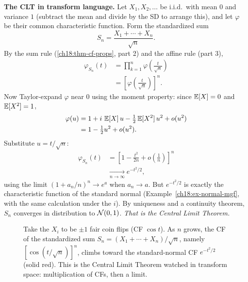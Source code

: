 \begin{focusbox}
\textbf{The CLT in transform language.} Let $X_1,X_2,\dots$ be i.i.d.\ with mean
$0$ and variance $1$ (subtract the mean and divide by the SD to arrange this),
and let $\varphi$ be their common characteristic function. Form the standardized
sum
\[
  S_n = \frac{X_1+\cdots+X_n}{\sqrt n}.
\]
By the sum rule (\ref{ch18:thm-cf-props}, part 2) and the affine rule (part 3),
\begin{align*}
  \varphi_{S_n}(t)
   &= \prod_{k=1}^n \varphi\!\left(\frac{t}{\sqrt n}\right) \\
   &= \left[\varphi\!\left(\frac{t}{\sqrt n}\right)\right]^n .
\end{align*}
Now Taylor-expand $\varphi$ near $0$ using the moment property: since $\operatorname{\mathbb{E}}[X]=0$
and $\operatorname{\mathbb{E}}[X^2]=1$,
\begin{align*}
  \varphi(u) &= 1 + i\,\operatorname{\mathbb{E}}[X]\,u - \tfrac12 \operatorname{\mathbb{E}}[X^2]\,u^2 + o(u^2) \\
             &= 1 - \tfrac12 u^2 + o(u^2).
\end{align*}
Substitute $u=t/\sqrt n$:
\begin{align*}
  \varphi_{S_n}(t)
   &= \left[1 - \frac{t^2}{2n} + o\!\left(\frac{1}{n}\right)\right]^n \\
   &\xrightarrow[n\to\infty]{} e^{-t^2/2},
\end{align*}
using the limit $(1+a_n/n)^n\to e^a$ when $a_n\to a$. But $e^{-t^2/2}$ is
exactly the characteristic function of the standard normal
(Example~\ref{ch18:ex-normal-mgf}, with the same calculation under the $i$). By
uniqueness and a continuity theorem, $S_n$ converges in distribution to
$\mathcal{N}(0,1)$. \emph{That is the Central Limit Theorem.}
\end{focusbox}

\begin{figure}[H]
\centering
{}
\caption{Take the $X_i$ to be $\pm1$ fair coin flips (CF $\cos t$). As $n$ grows,
the CF of the standardized sum $S_n=(X_1+\cdots+X_n)/\sqrt n$, namely
$[\cos(t/\sqrt n)]^n$, climbs toward the standard-normal CF $e^{-t^2/2}$
(solid red). This is the Central Limit Theorem watched in transform space:
multiplication of CFs, then a limit.}
\label{ch18:fig-clt}
\end{figure}

